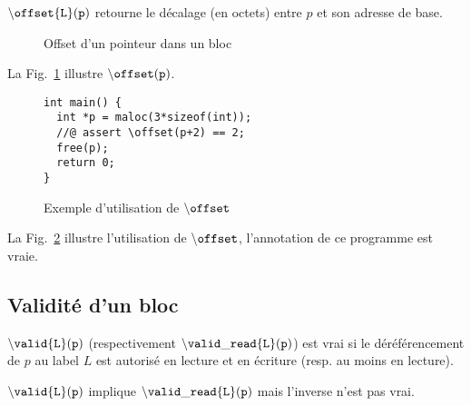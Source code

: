 ${\tt \backslash offset\{L\}(p)}$ retourne le décalage (en octets) entre $p$ et
son adresse de base.


\begin{figure}[h]
  \begin{center}
  \end{center}
  \caption{Offset d'un pointeur dans un bloc}
  \label{fig:offset}
\end{figure}

La Fig.~\ref{fig:offset} illustre ${\tt \backslash offset(p)}$.


\begin{figure}[h]
\begin{lstlisting}
int main() {
  int *p = maloc(3*sizeof(int));
  //@ assert \offset(p+2) == 2;
  free(p);
  return 0;
}
\end{lstlisting}
\caption{Exemple d'utilisation de ${\tt \backslash offset}$}
\label{fig:offset-example}
\end{figure}

 La
Fig.~\ref{fig:offset-example} illustre l'utilisation de
${\tt \backslash offset}$, l'annotation de ce programme est vraie.


\subsection{Validité d'un bloc}

${\tt \backslash valid\{L\}(p)}$ (respectivement
${\tt \backslash valid\_read\{L\}(p)}$) est vrai si le déréférencement de $p$
au label $L$ est autorisé en lecture et en écriture (resp. au moins en lecture).

${\tt \backslash valid\{L\}(p)}$ implique ${\tt \backslash valid\_read\{L\}(p)}$
mais l'inverse n'est pas vrai.




